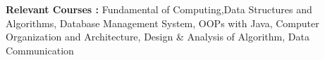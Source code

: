 \begin{cventries}
  \cventry
    {\large\textbf {Relevant Courses :}}
    {}
    {}
    {}
    {\small Fundamental of Computing,Data Structures and Algorithms, Database Management System, OOPs with Java, Computer Organization and Architecture, Design \& Analysis of Algorithm, Data Communication
    }
\end{cventries}